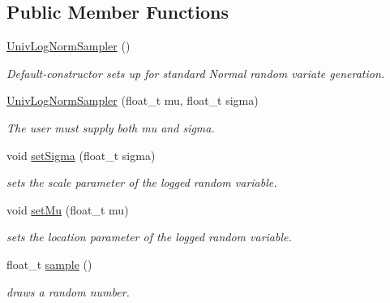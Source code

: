 \subsection*{Public Member Functions}
\begin{DoxyCompactItemize}
\item 
\mbox{\label{classrvsamp_1_1UnivLogNormSampler_aa31a7d6a486257b4a8404b74c7887b11}} 
\hyperlink{classrvsamp_1_1UnivLogNormSampler_aa31a7d6a486257b4a8404b74c7887b11}{Univ\+Log\+Norm\+Sampler} ()
\begin{DoxyCompactList}\small\item\em Default-\/constructor sets up for standard Normal random variate generation. \end{DoxyCompactList}\item 
\hyperlink{classrvsamp_1_1UnivLogNormSampler_acdec4ea77c92dad9603a49201997d4b7}{Univ\+Log\+Norm\+Sampler} (float\+\_\+t mu, float\+\_\+t sigma)
\begin{DoxyCompactList}\small\item\em The user must supply both mu and sigma. \end{DoxyCompactList}\item 
void \hyperlink{classrvsamp_1_1UnivLogNormSampler_a17c3147be7048605a457297f44a0d269}{set\+Sigma} (float\+\_\+t sigma)
\begin{DoxyCompactList}\small\item\em sets the scale parameter of the logged random variable. \end{DoxyCompactList}\item 
void \hyperlink{classrvsamp_1_1UnivLogNormSampler_af4d1a62b0cb1143290cac22922755a95}{set\+Mu} (float\+\_\+t mu)
\begin{DoxyCompactList}\small\item\em sets the location parameter of the logged random variable. \end{DoxyCompactList}\item 
float\+\_\+t \hyperlink{classrvsamp_1_1UnivLogNormSampler_a816c87875ed08b4b90f9fbe3fd4bda88}{sample} ()
\begin{DoxyCompactList}\small\item\em draws a random number. \end{DoxyCompactList}\end{DoxyCompactItemize}
